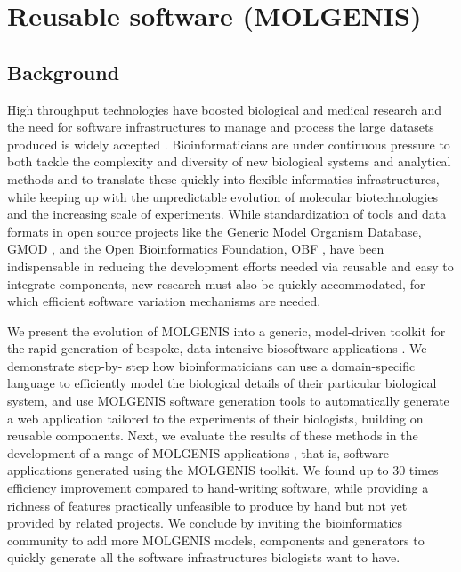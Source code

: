 \newpage

\section{Reusable software (MOLGENIS)}
\subsection{Background}
High throughput technologies have boosted biological and medical research and the need for software 
infrastructures to manage and process the large datasets produced is widely accepted \cite{Swertz:2007,
Stein:2008, Thorisson:2009}. Bioinformaticians are under continuous pressure to both tackle the complexity 
and diversity of new biological systems and analytical methods and to translate these quickly into 
flexible informatics infrastructures, while keeping up with the unpredictable evolution of molecular 
biotechnologies and the increasing scale of experiments. While standardization of tools and data formats 
in open source projects like the Generic Model Organism Database, GMOD \cite{OConnor:2008}, and the 
Open Bioinformatics Foundation, OBF \cite{OBF:2010:Online}, have been indispensable in reducing the 
development efforts needed via reusable and easy to integrate components, new research must also be 
quickly accommodated, for which efficient software variation mechanisms are needed.

We present the evolution of MOLGENIS into a generic, model-driven toolkit for the rapid generation of 
bespoke, data-intensive biosoftware applications \cite{Swertz:2010a}. We demonstrate step-by-
step how bioinformaticians can use a domain-specific language to efficiently model the biological 
details of their particular biological system, and use MOLGENIS software generation tools to 
automatically generate a web application tailored to the experiments of their biologists, 
building on reusable components. Next, we evaluate the results of these methods in the development 
of a range of MOLGENIS applications \cite{Swertz:2004, Swertz:2010a, Thorisson:2009, Leu:2010, 
Li:2009, Smedley:2008}, that is, software applications generated using the MOLGENIS toolkit. We found 
up to 30 times efficiency improvement compared to hand-writing software, while providing a richness 
of features practically unfeasible to produce by hand but not yet provided by related projects. We 
conclude by inviting the bioinformatics community to add more MOLGENIS models, components and 
generators to quickly generate all the software infrastructures biologists want to have.

